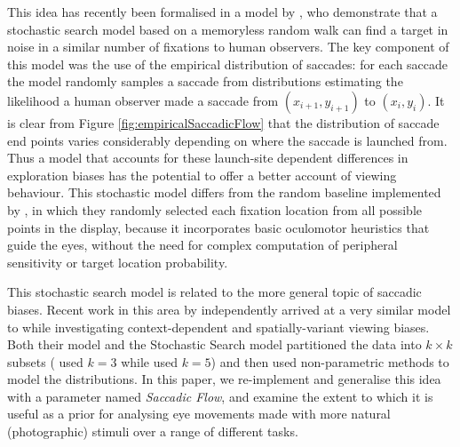 This idea has recently been formalised in a model by \cite{clarke2016}, who demonstrate that a stochastic search model based on a memoryless random walk can find a target in noise in a similar number of fixations to human observers. The key component of this model was the use of the empirical distribution of saccades: for each saccade the model randomly samples a saccade from distributions estimating the likelihood a human observer made a saccade from $(x_{i+1},y_{i+1})$ to $(x_i,y_i)$. It is clear from Figure \ref{fig:empiricalSaccadicFlow} that the distribution of saccade end points varies considerably depending on where the saccade is launched from. Thus a model that accounts for these launch-site dependent differences in exploration biases has the potential to offer a better account of viewing behaviour. This stochastic model differs from the random baseline implemented by \cite{najemnik-geisler2008}, in which they randomly selected each fixation location from all possible points in the display, because it incorporates basic oculomotor heuristics that guide the eyes, without the need for complex computation of peripheral sensitivity or target location probability. 

This stochastic search model is related to the more general topic of saccadic biases. Recent work in this area by \cite{leMeur-coutrot2016} independently arrived at a very similar model to \cite{clarke2016} while investigating context-dependent and spatially-variant viewing biases. Both their model and the Stochastic Search model partitioned the data into $k\times k$ subsets (\cite{leMeur-coutrot2016} used $k=3$ while \cite{clarke2016} used $k=5$) and then used non-parametric methods to model the distributions. In this paper, we re-implement and generalise this idea with a parameter named \textit{Saccadic Flow}, and examine the extent to which it is useful as a prior for analysing eye movements made with more natural (photographic) stimuli over a range of different tasks. 


